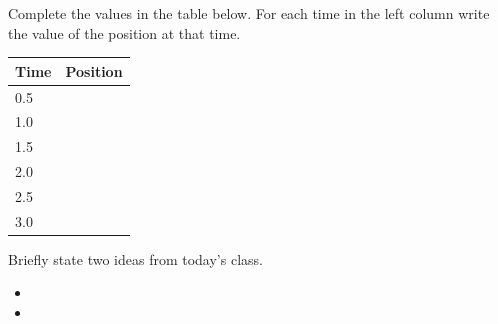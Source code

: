 \begin{problem}
\begin{subproblem}
    \scalebox{0.4}{}

    Complete the values in the table below. For each time in the left
    column write the value of the position at that time.

    \begin{tabular}{l|l}
      Time & Position \\ \hline
      0.5 & \\ [12pt]
      1.0 & \\  [12pt]
      1.5 & \\  [12pt]
      2.0 & \\  [12pt]
      2.5 & \\  [12pt]
      3.0 
    \end{tabular}


  \end{subproblem}


\end{problem}


\postClass

\begin{problem}
\item Briefly state two ideas from today's class.
  \begin{itemize}
  \item 
  \item 
  \end{itemize}
\item 
  \begin{subproblem}
    \item
  \end{subproblem}
\end{problem}




\begin{problem}
\item
\end{problem}



